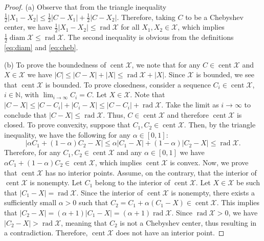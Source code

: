 \documentclass[10pt,a4paper]{amsart}
\DeclareMathOperator{\cent}{cent}
\DeclareMathOperator{\diam}{diam}
\DeclareMathOperator{\rad}{rad}
\newcommand{\norm}[1]{\left|#1\right|}
\begin{document}
\begin{proof}
(a) Observe that from the triangle inequality $\tfrac{1}{2}\norm{X_1-X_2}\leq \tfrac{1}{2}\norm{C-X_1}+\tfrac{1}{2}\norm{C-X_2}$. Therefore, taking $C$ to be a Chebyshev center, we have $\tfrac{1}{2}\norm{X_1-X_2}\leq \rad\mathcal{X}$ for all \mbox{$X_1,X_2\in\mathcal{X}$}, which implies $\tfrac{1}{2}\diam\mathcal{X}\leq\rad\mathcal{X}$. The second inequality is obvious from the definitions \eqref{eq:diam} and \eqref{eq:cheb}. 

(b) To prove the boundedness of $\cent\mathcal{X}$, we note that for any $C\in\cent\mathcal{X}$ and $X\in\mathcal{X}$ we have $\norm{C}\leq \norm{C-X}+\norm{X}\leq \rad\mathcal{X}+\norm{X}$. Since $\mathcal{X}$ is bounded, we see that $\cent\mathcal{X}$ is bounded. To prove closedness, consider a sequence $C_i\in\cent\mathcal{X}$, $i\in\mathbb{N}$, with $\lim_{i\rightarrow\infty} C_i=C$. Let $X\in\mathcal{X}$. Note that $\norm{C-X}\leq\norm{C-C_i}+\norm{C_i-X}\leq \norm{C-C_i}+\rad\mathcal{X}$. Take the limit as $i\rightarrow \infty$ to conclude that $\norm{C-X}\leq \rad\mathcal{X}$. Thus, $C\in\cent\mathcal{X}$ and therefore $\cent\mathcal{X}$ is closed. 
To prove convexity, suppose that $C_1,C_2\in\cent\mathcal{X}$. Then, by the triangle inequality, we have the following for any $\alpha\in[0,1]$:
\begin{equation}
\label{eq:prop:chebuniq-1}
\norm{\alpha C_1+(1-\alpha)C_2-X}\leq\alpha\norm{C_1-X}+(1-\alpha)\norm{C_2-X}\leq\rad\mathcal{X}.
\end{equation}
Therefore, for any $C_1,C_2\in\cent\mathcal{X}$ and any $\alpha\in[0,1]$ we have $\alpha C_1+(1-\alpha)C_2\in\cent\mathcal{X}$, which implies $\cent\mathcal{X}$ is convex. Now, we prove that $\cent\mathcal{X}$ has no interior points. Assume, on the contrary, that the interior of $\cent\mathcal{X}$ is nonempty. Let $C_1$ belong to the interior of $\cent\mathcal{X}$. Let $X\in\mathcal{X}$ be such that $|C_1-X|=\rad\mathcal{X}$. Since the interior of $\cent\mathcal{X}$ is nonempty, there exists a sufficiently small $\alpha>0$ such that $C_2=C_1+\alpha(C_1-X)\in\cent\mathcal{X}$. This implies that $|C_2-X|=(\alpha+1)|C_1-X|=(\alpha+1)\rad\mathcal{X}$. Since $\rad\mathcal{X}>0$, we have $|C_2 - X| > \rad \mathcal{X}$, meaning that $C_2$ is not a Chebyshev center, thus resulting in a contradiction. Therefore, $\cent\mathcal{X}$ does not have an interior point.


\end{proof}
\end{document}
